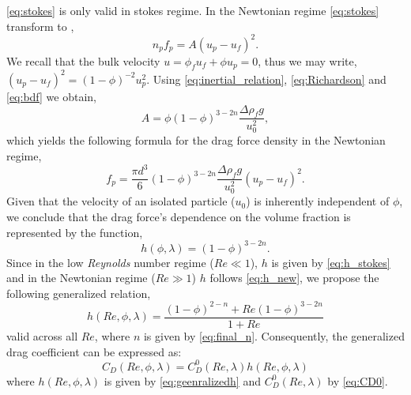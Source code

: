 \ref{eq:stokes} is only valid in stokes regime. 
In the Newtonian regime \ref{eq:stokes} transform to \citep{jackson2000}, 
\begin{equation}
    n_p f_p = A (u_p - u_f)^2. 
    \label{eq:inertial_relation}
\end{equation}
We recall that the bulk velocity $u= \phi_f u_f + \phi u_p = 0$, thus we may write, $(u_p - u_f)^2 = (1-\phi)^{-2} u_p^2$. 
Using \ref{eq:inertial_relation}, \ref{eq:Richardson} and \ref{eq:bdf} we obtain, 
\begin{equation*}
    A = \phi (1- \phi)^{3-2n}\frac{\Delta \rho_f g}{u_0^2},
\end{equation*}
which yields the following formula for the drag force density in the Newtonian regime, 
\begin{equation}
     f_p =\frac{ \pi d^3}{6}  (1- \phi)^{3-2n}\frac{\Delta \rho_f g}{u_0^2} (u_p - u_f)^2. 
\end{equation}
Given that the velocity of an isolated particle ($u_0$) is inherently independent of $\phi$, we conclude that the drag force's dependence on the volume fraction is represented by the function, 
\begin{equation}
    h(\phi,\lambda)
    = 
    (1-\phi)^{3- 2n}.
    \label{eq:h_new}
\end{equation}
Since in the low \textit{Reynolds} number regime ($Re\ll 1$), $h$ is given by \ref{eq:h_stokes} and in the Newtonian regime ($Re \gg 1$) $h$  follows \ref{eq:h_new}, we propose the following generalized relation,
\begin{equation}
    h(Re,\phi,\lambda)
    = \frac{(1-\phi)^{2-n}+ Re (1-\phi)^{3-2n}}{1+Re}
    \label{eq:geenralizedh}
\end{equation}
valid across all $Re$, where $n$ is given by \ref{eq:final_n}. 
Consequently, the generalized drag coefficient can be expressed as:
\begin{equation}
    C_D(Re,\phi,\lambda)
    = 
    C_D^0(Re,\lambda)
    h(Re,\phi,\lambda)
    \label{eq:C_d_finalRe}
\end{equation}
where $h(Re,\phi,\lambda)$ is given by \ref{eq:geenralizedh} and $C_D^0(Re,\lambda)$ by \ref{eq:CD0}. 


